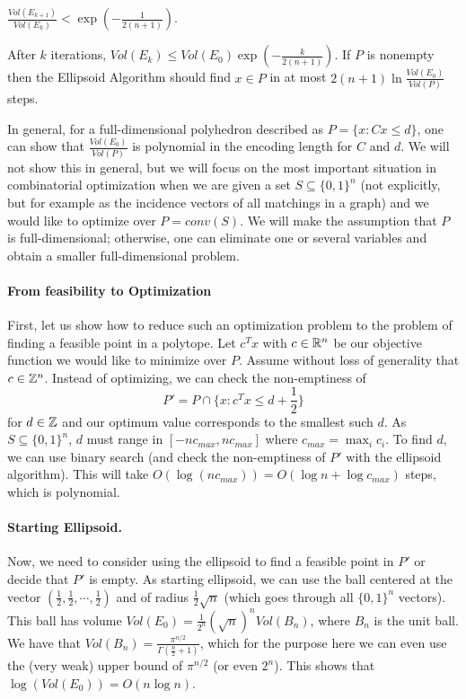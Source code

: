 \documentclass[12pt]{article}
\begin{document}
\begin{claim}
$\frac{Vol(E_{k+1})}{Vol(E_k)} <  \exp\left(-\frac{1}{2(n+1)}\right)$.
\end{claim}

After $k$ iterations, $Vol(E_k) \leq Vol(E_0)
\exp\left(-\frac{k}{2(n+1)}\right)$.  If $P$ is nonempty then the
Ellipsoid Algorithm should find $x \in P$ in at most $2(n+1) \ln
\frac{Vol(E_0)}{Vol(P)}$ steps. 

In general, for a full-dimensional polyhedron described as $P=\{x:
Cx\leq d\}$, one can show that $\frac{Vol(E_0)}{Vol(P)}$ is polynomial
in the encoding length for $C$ and $d$. We will not show this in
general, but we will focus on the most important situation in
combinatorial optimization when we are given a set $S\subseteq
\{0,1\}^n$ (not explicitly, but for example as the incidence vectors
of all matchings in a graph) and we would like to optimize over
$P=conv(S)$. We will make the assumption that $P$ is full-dimensional;
otherwise, one can eliminate one or several variables and obtain a
smaller full-dimensional problem. 

\paragraph{From feasibility to Optimization} 
First, let us show how to reduce such an optimization problem to the
problem of finding a feasible point in a polytope. Let $c^Tx$ with
$c\in {\mathbb R}^n$ be our objective function we would like to minimize over
$P$. Assume without loss of generality that $c\in {\mathbb Z}^n$. Instead of
optimizing, we can check the non-emptiness of 
$$P'=P\cap \{x: c^Tx\leq d+\frac{1}{2}\}$$ for $d\in {\mathbb Z}$ and our optimum
value corresponds to the smallest such $d$. As $S\subseteq \{0,1\}^n$,
$d$ must range in $[-n c_{max},nc_{max}]$ where $c_{max}=\max_i c_i$.
To find $d$, we can use binary search (and check the non-emptiness of
$P'$ with the ellipsoid algorithm). This will take $O(\log
(nc_{max}))=O(\log n+\log c_{max})$ steps, which is polynomial. 

\paragraph{Starting Ellipsoid.} 
Now, we need to consider using the ellipsoid to find a feasible point
in $P'$ or decide that $P'$ is empty. As starting ellipsoid, we can
use the ball centered at the vector $(\frac{1}{2}, \frac{1}{2},
\cdots, \frac{1}{2})$ and of radius $\frac{1}{2} \sqrt{n}$ (which goes
through all $\{0,1\}^n$ vectors). This ball has volume
$Vol(E_0)=\frac{1}{2^n} (\sqrt{n})^n Vol(B_n)$, where $B_n$ is the
unit ball. We have that
$Vol(B_n)=\frac{\pi^{n/2}}{\Gamma(\frac{n}{2}+1)}$, which for the
purpose here we can even use the (very weak) upper bound of
$\pi^{n/2}$ (or even $2^n$). This shows that $\log(Vol(E_0))=O(n \log n)$.
\end{document}
